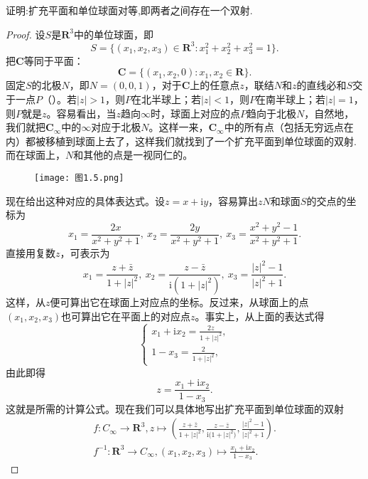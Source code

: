 \documentclass[../../main.tex]{subfiles}
\begin{document}
\begin{proposition}
证明:扩充平面和单位球面对等,即两者之间存在一个双射.
\end{proposition}
\begin{proof}
设\(S\)是\(\mathbf{R}^3\)中的单位球面，即
\[
S = \{ (x_1, x_2, x_3) \in \mathbf{R}^3 : x_1^2 + x_2^2 + x_3^2 = 1 \}.
\]
把\(\mathbf{C}\)等同于平面：
\[
\mathbf{C} = \{ (x_1, x_2, 0) : x_1, x_2 \in \mathbf{R} \}.
\]
固定\(S\)的北极\(N\)，即\(N = (0, 0, 1)\)，对于\(\mathbf{C}\)上的任意点\(z\)，联结\(N\)和\(z\)的直线必和\(S\)交于一点\(P\)（）。若\(|z| > 1\)，则\(P\)在北半球上；若\(|z| < 1\)，则\(P\)在南半球上；若\(|z| = 1\)，则\(P\)就是\(z\)。容易看出，当\(z\)趋向\(\infty\)时，球面上对应的点\(P\)趋向于北极\(N\)，自然地，我们就把\(\mathbf{C}_\infty\)中的\(\infty\)对应于北极\(N\)。这样一来，\(\mathbf{C}_\infty\)中的所有点（包括无穷远点在内）都被移植到球面上去了，这样我们就找到了一个扩充平面到单位球面的双射.而在球面上，\(N\)和其他的点是一视同仁的。
\begin{figure}[H]
\centering
\texttt{[image: 图1.5.png]}
\caption{}
\label{figure:图1.5}
\end{figure}
现在给出这种对应的具体表达式。设\(z = x + \mathrm{i}y\)，容易算出\(zN\)和球面\(S\)的交点的坐标为
\[
x_1 = \frac{2x}{x^2 + y^2 + 1}, \ x_2 = \frac{2y}{x^2 + y^2 + 1}, \ x_3 = \frac{x^2 + y^2 - 1}{x^2 + y^2 + 1}.
\]
直接用复数\(z\)，可表示为
\[
x_1 = \frac{z + \bar{z}}{1 + |z|^2}, \ x_2 = \frac{z - \bar{z}}{\mathrm{i}(1 + |z|^2)}, \ x_3 = \frac{|z|^2 - 1}{|z|^2 + 1}.
\]
这样，从\(z\)便可算出它在球面上对应点的坐标。反过来，从球面上的点\((x_1, x_2, x_3)\)也可算出它在平面上的对应点\(z\)。事实上，从上面的表达式得
\[
\begin{cases}
x_1 + \mathrm{i}x_2 = \frac{2z}{1 + |z|^2}, \\
1 - x_3 = \frac{2}{1 + |z|^2},
\end{cases}
\]
由此即得
\[
z = \frac{x_1 + \mathrm{i}x_2}{1 - x_3}.
\]
这就是所需的计算公式。现在我们可以具体地写出扩充平面到单位球面的双射
\begin{gather*}
f:C_{\infty}\longrightarrow \mathbf{R} ^3,
z\longmapsto \left( \frac{z+\bar{z}}{1+|z|^2}, \frac{z-\bar{z}}{\mathrm{i(}1+|z|^2)}, \frac{|z|^2-1}{|z|^2+1} \right) .
\\
f^{-1}:\mathbf{R} ^3\longrightarrow C_{\infty},
\left( x_1,x_2,x_3 \right) \longmapsto \frac{x_1+\mathrm{i}x_2}{1-x_3}.
\end{gather*}
\end{proof}
\end{document}
